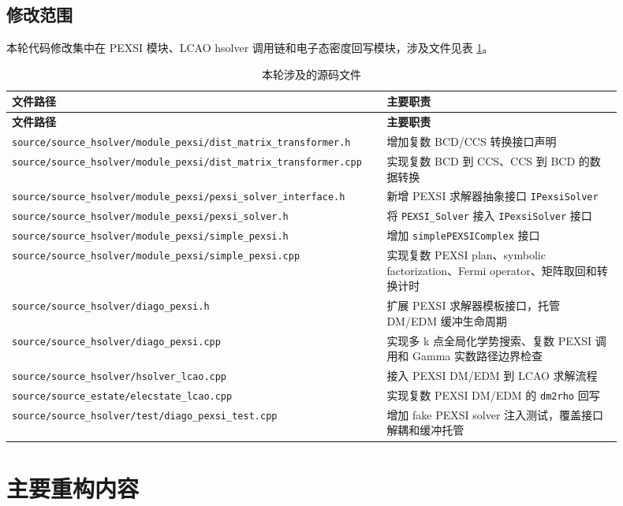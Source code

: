 \documentclass[a4paper,11pt]{article}
\newcommand{\code}[1]{\texttt{#1}}
\begin{document}
\subsection{修改范围}

本轮代码修改集中在 PEXSI 模块、LCAO hsolver 调用链和电子态密度回写模块，涉及文件见表 \ref{tab:source-files}。

\begin{longtable}{@{}p{0.53\linewidth}p{0.37\linewidth}@{}}
\caption{本轮涉及的源码文件}
\label{tab:source-files}\\
\toprule
\textbf{文件路径} & \textbf{主要职责}\\
\midrule
\endfirsthead
\toprule
\textbf{文件路径} & \textbf{主要职责}\\
\midrule
\endhead
\code{source/source\_hsolver/module\_pexsi/dist\_matrix\_transformer.h} & 增加复数 BCD/CCS 转换接口声明\\
\code{source/source\_hsolver/module\_pexsi/dist\_matrix\_transformer.cpp} & 实现复数 BCD 到 CCS、CCS 到 BCD 的数据转换\\
\code{source/source\_hsolver/module\_pexsi/pexsi\_solver\_interface.h} & 新增 PEXSI 求解器抽象接口 \code{IPexsiSolver}\\
\code{source/source\_hsolver/module\_pexsi/pexsi\_solver.h} & 将 \code{PEXSI\_Solver} 接入 \code{IPexsiSolver} 接口\\
\code{source/source\_hsolver/module\_pexsi/simple\_pexsi.h} & 增加 \code{simplePEXSIComplex} 接口\\
\code{source/source\_hsolver/module\_pexsi/simple\_pexsi.cpp} & 实现复数 PEXSI plan、symbolic factorization、Fermi operator、矩阵取回和转换计时\\
\code{source/source\_hsolver/diago\_pexsi.h} & 扩展 PEXSI 求解器模板接口，托管 DM/EDM 缓冲生命周期\\
\code{source/source\_hsolver/diago\_pexsi.cpp} & 实现多 k 点全局化学势搜索、复数 PEXSI 调用和 Gamma 实数路径边界检查\\
\code{source/source\_hsolver/hsolver\_lcao.cpp} & 接入 PEXSI DM/EDM 到 LCAO 求解流程\\
\code{source/source\_estate/elecstate\_lcao.cpp} & 实现复数 PEXSI DM/EDM 的 \code{dm2rho} 回写\\
\code{source/source\_hsolver/test/diago\_pexsi\_test.cpp} & 增加 fake PEXSI solver 注入测试，覆盖接口解耦和缓冲托管\\
\bottomrule
\end{longtable}

\section{主要重构内容}
\end{document}
